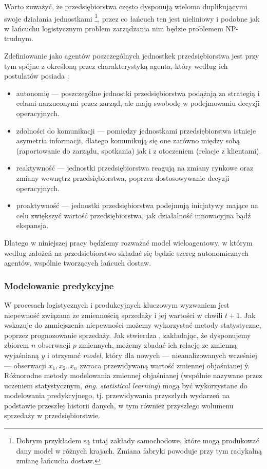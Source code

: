 \documentclass[polish, twoside, 12pt, a4paper]{article}
\theoremstyle{definition}
\theoremstyle{plain}
\theoremstyle{remark}
\begin{document}
Warto zuważyć, że przedsiębiorstwa często dysponują wieloma duplikującymi swoje działania jednostkami \footnote{Dobrym przykładem są tutaj zakłady samochodowe, które mogą produkować dany model w różnych krajach. Zmiana fabryki powoduje przy tym radykalną zmianę łańcucha dostaw.}, przez co łańcuch ten jest nieliniowy i podobne jak w łańcuchu logistycznym problem zarządzania nim będzie problemem NP-trudnym.

Zdefiniowanie jako agentów poszczególnych jednostkek przedsiębiorstwa jest przy tym spójne z określoną przez \cite{Wooldridge1995} charakterystyką agenta, który według ich postulatów posiada : 

	\begin{itemize}
		\item autonomię --- poszczególne jednostki przedsiębiorstwa podążają za strategią i celami narzuconymi przez zarząd, ale mają swobodę w podejmowaniu decyzji operacyjnych.
		\item zdolności do komunikacji --- pomiędzy jednostkami przedsiębiorstwa istnieje asymetria informacji, dlatego komunikują się one zarówno między sobą (raportowanie do zarządu, spotkania) jak i z otoczeniem (relacje z klientami).
		\item reaktywność --- jednostki przedsiębiorstwa reagują na zmiany rynkowe oraz zmiany wewnętrz przedsiębiorstwa, poprzez dostosowywanie decyzji operacyjnych.
	 	\item proaktywność --- jednostki przedsiębiorstwa podejmują inicjatywy mające na celu zwiększyć wartość przedsiębiorstwa, jak działalność innowacyjna bądź ekspansja. 
	\end{itemize}
 
 Dlatego w niniejszej pracy będziemy rozważać model wieloagentowy, w którym według założeń na przedsiebiorstwo składać się będzie szereg autonomicznych agentów, wspólnie tworzących łańcuch dostaw.

\subsubsection{Modelowanie predykcyjne} \label{chapter:statistical} 
W procesach logistycznych i produkcyjnych kluczowym wyzwaniem jest niepewność związana ze zmiennością sprzedaży i jej wartości w chwili $t+1$. Jak wskazuje \cite{James2013} do zmniejszenia niepewności możemy wykorzystać metody statystyczne, poprzez prognozowanie sprzedaży. Jak stwierdza \cite{James2013}, zakładając, że dysponujemy zbiorem $n$ obserwacji $p$ zmiennych, możemy zbadać ich relację ze zmienną wyjaśnianą $y$ i otrzymać \textit{model}, który dla nowych --- nieanalizowanych wcześniej --- obserwacji $x_1,x_2..x_n$  zwraca przewidywaną wartość zmiennej objaśnianej \^{y}. Różnorodne metody modelowania zmiennej objaśnianej (wspólnie nazywane przez \cite{James2013} uczeniem statystycznym, \textit{ang. statistical learning}) mogą być wykorzystane do modelowania predykcyjnego, tj. przewidywania przyszłych wydarzeń na podstawie przeszłej historii danych, w tym również przyszłego wolumenu sprzedaży w przedsiębiorstwie. 
\end{document}
